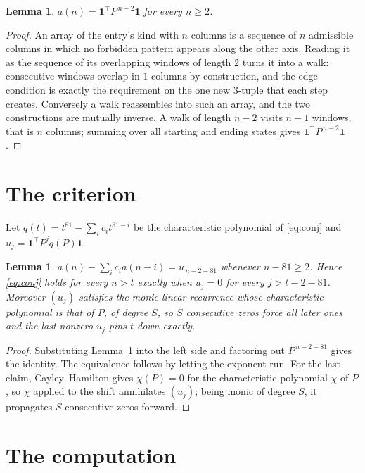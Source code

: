 \documentclass[11pt,a4paper]{article}
\theoremstyle{plain}
\newtheorem{lemma}[theorem]{Lemma}
\theoremstyle{definition}
\begin{document}
\begin{lemma}\label{lem:walk}
$a(n)=\mathbf{1}^{\!\top}P^{\,n-2}\mathbf{1}$ for every $n\ge2$.
\end{lemma}

\begin{proof}
An array of the entry's kind with $n$ columns is a sequence of $n$ admissible columns in
which no forbidden pattern appears along the other axis. Reading it as the sequence of its
overlapping windows of length $2$ turns it into a walk: consecutive windows overlap in
$1$ columns by construction, and the edge condition is exactly the requirement on the one
new $3$-tuple that each step creates. Conversely a walk reassembles into such an array,
and the two constructions are mutually inverse. A walk of length $n-2$ visits $n-1$
windows, that is $n$ columns; summing over all starting and ending states gives
$\mathbf{1}^{\!\top}P^{\,n-2}\mathbf{1}$.
\end{proof}

\section{The criterion}

Let $q(t)=t^{81}-\sum_i c_i t^{81-i}$ be the characteristic polynomial of
\eqref{eq:conj} and $u_j=\mathbf{1}^{\!\top}P^{j}q(P)\mathbf{1}$.

\begin{lemma}\label{lem:crit}
$a(n)-\sum_i c_i a(n-i)=u_{\,n-2-81}$ whenever $n-81\ge2$. Hence
\eqref{eq:conj} holds for every $n>t$ exactly when $u_j=0$ for every
$j>t-2-81$. Moreover $(u_j)$ satisfies the monic linear recurrence whose
characteristic polynomial is that of $P$, of degree $S$, so $S$ consecutive zeros force all
later ones and the last nonzero $u_j$ pins $t$ down exactly.
\end{lemma}

\begin{proof}
Substituting Lemma~\ref{lem:walk} into the left side and factoring out
$P^{\,n-2-81}$ gives the identity. The equivalence follows by letting the exponent
run. For the last claim, Cayley--Hamilton gives $\chi(P)=0$ for the characteristic
polynomial $\chi$ of $P$, so $\chi$ applied to the shift annihilates $(u_j)$; being monic of
degree $S$, it propagates $S$ consecutive zeros forward.
\end{proof}

\section{The computation}
\end{document}
